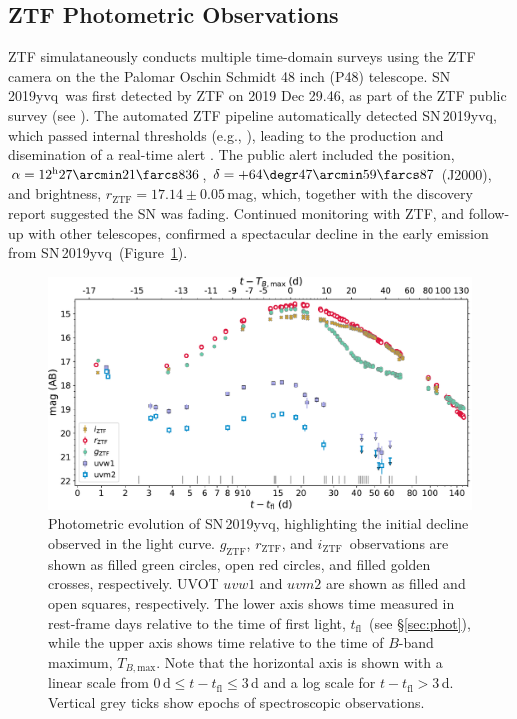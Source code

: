 \documentclass[twocolumn]{aastex63}
\newcommand{\rztf}{$r_\mathrm{ZTF}$}
\newcommand{\gztf}{$g_\mathrm{ZTF}$}
\newcommand{\iztf}{$i_\mathrm{ZTF}$}
\newcommand{\tfl}{$t_\mathrm{fl}$}
\newcommand{\tbmax}{$T_{B,\mathrm{max}}$}
\newcommand{\sn}{SN\,2019yvq}
\begin{document}
\subsection{ZTF Photometric Observations}

ZTF simulataneously conducts multiple time-domain surveys using the ZTF
camera on the the Palomar Oschin Schmidt 48 inch (P48) telescope. \sn\ was
first detected by ZTF on 2019 Dec 29.46, as part of the ZTF public survey
(see \citealt{Bellm19a}). The automated ZTF pipeline \citep{Masci19}
automatically detected \sn, which passed internal thresholds (e.g.,
\citealt{Mahabal19}), leading to the production and disemination of a
real-time alert \citep{Patterson19}. The public alert included the position,
$\alpha = 12^{\mathrm{h}}27\arcmin21\farcs836$, $\delta =
+64\degr47\arcmin59\farcs87$ (J2000), and brightness, \rztf$ =
17.14\pm0.05$\,mag, which, together with the \citet{Itagaki19} discovery
report suggested the SN was fading. Continued monitoring with ZTF, and
follow-up with other telescopes, confirmed a spectacular decline in the early
emission from \sn\ (Figure~\ref{fig:p48}).

\begin{figure}
    \centering
    \includegraphics[width=6in]{./figures/P48_lc.pdf}
    \caption{Photometric evolution of \sn, highlighting the initial decline
    observed in the light curve. \gztf, \rztf, and \iztf\ observations are
    shown as filled green circles, open red circles, and filled golden
    crosses, respectively. UVOT $uvw1$ and $uvm2$ are shown as filled and
    open squares, respectively. The lower axis shows time measured in
    rest-frame days relative to the time of first light, \tfl\ (see
    \S\ref{sec:phot}), while the upper axis shows time relative to the time
    of $B$-band maximum, \tbmax. Note that the horizontal axis is shown with
    a linear scale from $0\,\mathrm{d} \le t - t_\mathrm{fl} \le 3$\,d and a
    log scale for $t - t_\mathrm{fl} > 3$\,d. Vertical grey ticks show
    epochs of spectroscopic observations.}
    \label{fig:p48}
\end{figure}
\end{document}
